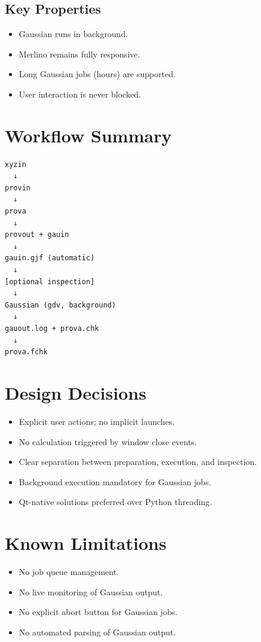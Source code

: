 \documentclass[11pt,a4paper]{article}
\begin{document}
\subsection*{Key Properties}
\begin{itemize}[nosep]
  \item Gaussian runs in background.
  \item Merlino remains fully responsive.
  \item Long Gaussian jobs (hours) are supported.
  \item User interaction is never blocked.
\end{itemize}

\section*{Workflow Summary}

\begin{verbatim}
xyzin
  ↓
provin
  ↓
prova
  ↓
provout + gauin
  ↓
gauin.gjf (automatic)
  ↓
[optional inspection]
  ↓
Gaussian (gdv, background)
  ↓
gauout.log + prova.chk
  ↓
prova.fchk
\end{verbatim}

\section*{Design Decisions}

\begin{itemize}[nosep]
  \item Explicit user actions; no implicit launches.
  \item No calculation triggered by window close events.
  \item Clear separation between preparation, execution, and inspection.
  \item Background execution mandatory for Gaussian jobs.
  \item Qt-native solutions preferred over Python threading.
\end{itemize}

\section*{Known Limitations}

\begin{itemize}[nosep]
  \item No job queue management.
  \item No live monitoring of Gaussian output.
  \item No explicit abort button for Gaussian jobs.
  \item No automated parsing of Gaussian output.
\end{itemize}
\end{document}
